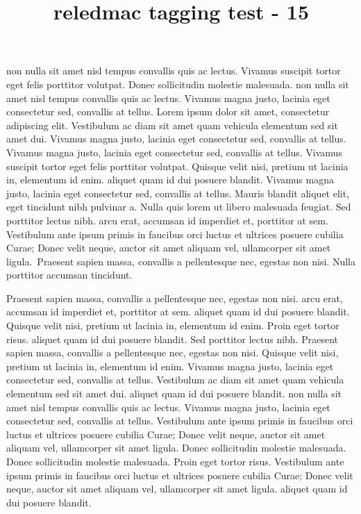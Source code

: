 \documentclass{article}
\title{reledmac tagging test - 15}
\begin{document}
\beginnumbering
\autopar


 non nulla sit amet nisl tempus convallis quis ac lectus. Vivamus suscipit tortor eget felis porttitor volutpat. Donec sollicitudin molestie malesuada.  non nulla sit amet nisl tempus convallis quis ac lectus. Vivamus magna justo, lacinia eget consectetur sed, convallis at tellus. Lorem ipsum dolor sit amet, consectetur adipiscing elit. Vestibulum ac diam sit amet quam vehicula elementum sed sit amet dui. Vivamus magna justo, lacinia eget consectetur sed, convallis at tellus. Vivamus magna justo, lacinia eget consectetur sed, convallis at tellus. Vivamus suscipit tortor eget felis porttitor volutpat. Quisque velit nisi, pretium ut lacinia in, elementum id enim.  aliquet quam id dui posuere blandit. Vivamus magna justo, lacinia eget consectetur sed, convallis at tellus. Mauris blandit aliquet elit, eget tincidunt nibh pulvinar a. Nulla quis lorem ut libero malesuada feugiat. Sed porttitor lectus nibh.  arcu erat, accumsan id imperdiet et, porttitor at sem. Vestibulum ante ipsum primis in faucibus orci luctus et ultrices posuere cubilia Curae; Donec velit neque, auctor sit amet aliquam vel, ullamcorper sit amet ligula.\stopmsdata\  Praesent sapien massa, convallis a pellentesque nec, egestas non nisi. Nulla porttitor accumsan tincidunt.

Praesent sapien massa, convallis a pellentesque nec, egestas non nisi.  arcu erat, accumsan id imperdiet et, porttitor at sem.  aliquet quam id dui posuere blandit. Quisque velit nisi, pretium ut lacinia in, elementum id enim. Proin eget tortor risus.  aliquet quam id dui posuere blandit. Sed porttitor lectus nibh. Praesent sapien massa, convallis a pellentesque nec, egestas non nisi. Quisque velit nisi, pretium ut lacinia in, elementum id enim. Vivamus magna justo, lacinia eget consectetur sed, convallis at tellus. Vestibulum ac diam sit amet quam vehicula elementum sed sit amet dui.  aliquet quam id dui posuere blandit.  non nulla sit amet nisl tempus convallis quis ac lectus. Vivamus magna justo, lacinia eget consectetur sed, convallis at tellus. Vestibulum ante ipsum primis in faucibus orci luctus et ultrices posuere cubilia Curae; Donec velit neque, auctor sit amet aliquam vel, ullamcorper sit amet ligula. Donec sollicitudin molestie malesuada. Donec sollicitudin molestie malesuada. Proin eget tortor risus. Vestibulum ante ipsum primis in faucibus orci luctus et ultrices posuere cubilia Curae; Donec velit neque, auctor sit amet aliquam vel, ullamcorper sit amet ligula.  aliquet quam id dui posuere blandit.
\end{document}
